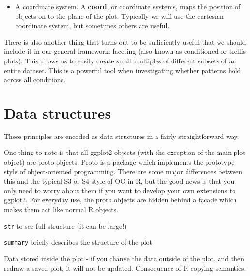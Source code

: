 \begin{itemize}
  \item A coordinate system.  A {\bf coord}, or coordinate systems, maps the position of objects on to the plane of the plot.  Typically we will use the cartesian coordinate system, but sometimes others are useful.
\end{itemize}

There is also another thing that turns out to be sufficiently useful that we should include it in our general framework: faceting (also known as conditioned or trellis plots). This allows us to easily create small multiples of different subsets of an entire dataset. This is a powerful tool when investigating whether patterns hold across all conditions.


\section{Data structures}
\label{sec:data_structures}

These principles are encoded as data structures in a fairly straightforward way.

One thing to note is that all ggplot2 objects (with the exception of the main plot object) are proto objects.  Proto is a package which implements the prototype-style of object-oriented programming.  There are some major differences between this and the typical S3 or S4 style of OO in R, but the good news is that you only need to worry about them if you want to develop your own extensions to ggplot2.  For everyday use, the proto objects are hidden behind a facade which makes them act like normal R objects.

{\tt str} to see full structure (it can be large!)

{\tt summary} briefly describes the structure of the plot

Data stored inside the plot - if you change the data outside of the plot, and then redraw a saved plot, it will not be updated.  Consequence of R copying semantics.

